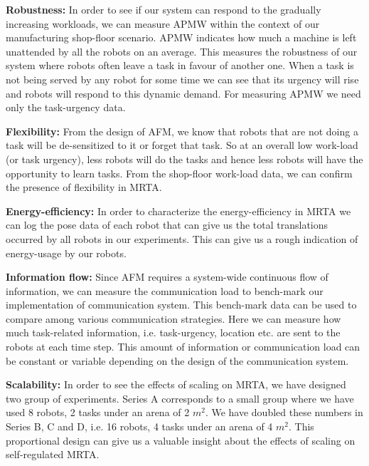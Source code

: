 \documentclass[smallcondensed]{svjour3}
\begin{document}
\textbf{Robustness:} In order to see if our system can respond to the gradually increasing workloads,  we can measure APMW within the context of our manufacturing shop-floor scenario. APMW indicates how much a machine is left unattended by all the robots on an average. This measures the robustness of our system where robots often leave a task in favour of another one. When a task is not being served by any robot for some time we can see that its urgency will rise and robots will respond to this dynamic demand. For measuring APMW we need only the task-urgency data.

\textbf{Flexibility:} From the design of AFM, we know that robots that are not doing a task will be de-sensitized to it or forget that task. So at an overall low work-load (or task urgency), less robots will do the tasks and hence less robots will have the opportunity to learn tasks. From the shop-floor work-load data, we can confirm the presence of flexibility in MRTA.

\textbf{Energy-efficiency:} In order to characterize the energy-efficiency in MRTA we can log the pose data of each robot that can give us the total translations occurred by all robots in our experiments. This can give us a rough indication of energy-usage by our robots. 

\textbf{Information flow:} Since AFM requires a system-wide continuous flow of information, we can measure the communication load to bench-mark our implementation of communication system. This bench-mark data can be used to compare among various communication strategies. Here we can measure  how much task-related information, i.e. task-urgency, location etc. are sent to the robots at each time step. This  amount of information or communication load can be constant or variable depending on the design of the communication system.

\textbf{Scalability:} In order to see the effects of scaling on MRTA, we have designed two group of experiments. Series A corresponds to a small group where we have used 8 robots, 2 tasks under an arena of 2 $m^2$. We have doubled these numbers in Series B, C and D, i.e. 16 robots, 4 tasks under an arena of 4 $m^2$. This proportional design can give us a valuable insight about the effects of scaling on self-regulated MRTA. 
\end{document}
